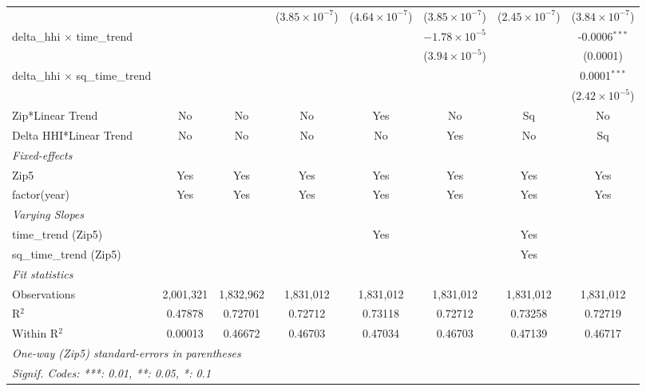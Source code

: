 \begin{table}[H]
{\begin{tabular}{lccccccc}
   &   &    & ($3.85\times 10^{-7}$) & ($4.64\times 10^{-7}$) & ($3.85\times 10^{-7}$) & ($2.45\times 10^{-7}$) & ($3.84\times 10^{-7}$)\\ 

 delta\_hhi $\times $ time\_trend&   &    &    &    & $-1.78\times 10^{-5}$ &    & -0.0006$^{***}$\\ 

   &   &    &    &    & ($3.94\times 10^{-5}$) &    & (0.0001)\\ 

 delta\_hhi $\times $ sq\_time\_trend&   &    &    &    &    &    & 0.0001$^{***}$\\ 

   &   &    &    &    &    &    & ($2.42\times 10^{-5}$)\\ 

 Zip*Linear Trend & No & No & No & Yes & No & Sq & No\\ 

 Delta HHI*Linear Trend & No & No & No & No & Yes & No & Sq\\ 

 \midrule \emph{Fixed-effects}&   &   &   &   &   &   &  \\ 

 Zip5 & Yes & Yes & Yes & Yes & Yes & Yes & Yes\\ 

 factor(year) & Yes & Yes & Yes & Yes & Yes & Yes & Yes\\ 

 \midrule \emph{Varying Slopes}&   &   &   &   &   &   &  \\ 

 time\_trend (Zip5) &  &  &  & Yes &  & Yes & \\ 

 sq\_time\_trend (Zip5) &  &  &  &  &  & Yes & \\ 

 \midrule \emph{Fit statistics}&  & & & & & & \\ 

 Observations & 2,001,321&1,832,962&1,831,012&1,831,012&1,831,012&1,831,012&1,831,012\\ 

 R$^2$ & 0.47878&0.72701&0.72712&0.73118&0.72712&0.73258&0.72719\\ 

 Within R$^2$ & 0.00013&0.46672&0.46703&0.47034&0.46703&0.47139&0.46717\\ 

 \midrule\midrule\multicolumn{8}{l}{\emph{One-way (Zip5) standard-errors in parentheses}}\\ 

 \multicolumn{8}{l}{\emph{Signif. Codes: ***: 0.01, **: 0.05, *: 0.1}}\\ 

 \end{tabular}} 

 \end{table} 

  

